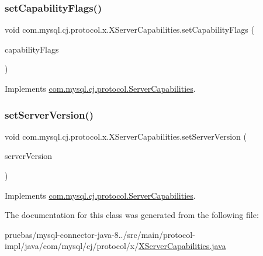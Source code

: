 \subsubsection{\texorpdfstring{set\+Capability\+Flags()}{setCapabilityFlags()}}
{\footnotesize\ttfamily void com.\+mysql.\+cj.\+protocol.\+x.\+X\+Server\+Capabilities.\+set\+Capability\+Flags (\begin{DoxyParamCaption}\item[{int}]{capability\+Flags }\end{DoxyParamCaption})}



Implements \mbox{\hyperlink{interfacecom_1_1mysql_1_1cj_1_1protocol_1_1_server_capabilities_ab5da8f1853ad82353d0446b785d98ee2}{com.\+mysql.\+cj.\+protocol.\+Server\+Capabilities}}.

\mbox{\label{classcom_1_1mysql_1_1cj_1_1protocol_1_1x_1_1_x_server_capabilities_a352b240088439d6dff829d1f0a879d96}} 
\subsubsection{\texorpdfstring{set\+Server\+Version()}{setServerVersion()}}
{\footnotesize\ttfamily void com.\+mysql.\+cj.\+protocol.\+x.\+X\+Server\+Capabilities.\+set\+Server\+Version (\begin{DoxyParamCaption}\item[{\mbox{\hyperlink{classcom_1_1mysql_1_1cj_1_1_server_version}{Server\+Version}}}]{server\+Version }\end{DoxyParamCaption})}



Implements \mbox{\hyperlink{interfacecom_1_1mysql_1_1cj_1_1protocol_1_1_server_capabilities_a4474ed857120dcbd9148d3b94e2962ac}{com.\+mysql.\+cj.\+protocol.\+Server\+Capabilities}}.



The documentation for this class was generated from the following file\+:\begin{DoxyCompactItemize}
\item 
pruebas/mysql-\/connector-\/java-\/8../src/main/protocol-\/impl/java/com/mysql/cj/protocol/x/\mbox{\hyperlink{_x_server_capabilities_8java}{X\+Server\+Capabilities.\+java}}\end{DoxyCompactItemize}
